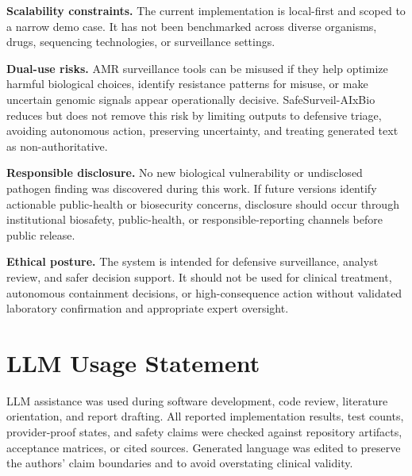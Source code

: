 \documentclass[11pt, letterpaper]{article}
\newcommand{\project}{SafeSurveil-AIxBio}
\begin{document}
\textbf{Scalability constraints.} The current implementation is local-first and scoped to a narrow demo case. It has not been benchmarked across diverse organisms, drugs, sequencing technologies, or surveillance settings.

\textbf{Dual-use risks.} AMR surveillance tools can be misused if they help optimize harmful biological choices, identify resistance patterns for misuse, or make uncertain genomic signals appear operationally decisive. \project{} reduces but does not remove this risk by limiting outputs to defensive triage, avoiding autonomous action, preserving uncertainty, and treating generated text as non-authoritative.

\textbf{Responsible disclosure.} No new biological vulnerability or undisclosed pathogen finding was discovered during this work. If future versions identify actionable public-health or biosecurity concerns, disclosure should occur through institutional biosafety, public-health, or responsible-reporting channels before public release.

\textbf{Ethical posture.} The system is intended for defensive surveillance, analyst review, and safer decision support. It should not be used for clinical treatment, autonomous containment decisions, or high-consequence action without validated laboratory confirmation and appropriate expert oversight.

\section*{LLM Usage Statement}

LLM assistance was used during software development, code review, literature orientation, and report drafting. All reported implementation results, test counts, provider-proof states, and safety claims were checked against repository artifacts, acceptance matrices, or cited sources. Generated language was edited to preserve the authors' claim boundaries and to avoid overstating clinical validity.
\end{document}
